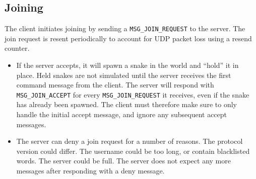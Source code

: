 \subsection{Joining}

\begin{center}

\end{center}

The  client  initiates  joining  by  sending  a \verb$MSG_JOIN_REQUEST$ to the
server.  The  join  request is resent periodically to account for  UDP  packet
loss using a resend counter.

\begin{itemize}
\item If the server accepts, it  will  spawn a snake in the world and ``hold''
it in place. Held snakes are not simulated until the server receives the first
command   message   from   the   client.   The   server  will   respond   with
\verb$MSG_JOIN_ACCEPT$ for every \verb$MSG_JOIN_REQUEST$ it receives, even  if
the  snake has already been spawned. The client must therefore  make  sure  to
only  handle  the  initial  accept  message,  and ignore any subsequent accept
messages.
\item The server can deny a join request for a number of reasons. The protocol
version could differ. The  username  could be too long, or contain blacklisted
words. The  server could be full. The server does not expect any more messages
after responding with a deny message.
\end{itemize}

\vspace{1.5em}

\begin{figure}[H]

\end{figure}

\vspace{1.5em}

\begin{figure}[H]

\end{figure}
